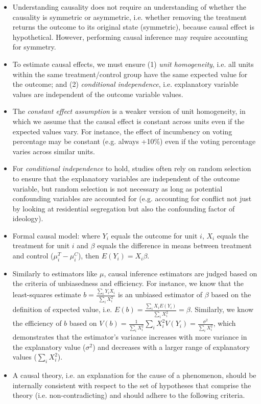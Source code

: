 \documentclass[11pt,letterpaper]{article}
\begin{document}
\begin{itemize}
\item Understanding causality does not require an understanding of whether the causality is symmetric or asymmetric, i.e. whether removing the treatment returns the outcome to its original state (symmetric), because causal effect is hypothetical. However, performing causal inference may require accounting for symmetry.
\item To estimate causal effects, we must ensure (1) \emph{unit homogeneity}, i.e. all units within the same treatment/control group have the same expected value for the outcome; and (2) \emph{conditional independence}, i.e. explanatory variable values are independent of the outcome variable values. 
\item The \emph{constant effect assumption} is a weaker version of unit homogeneity, in which we assume that the causal effect is constant across units even if the expected values vary. For instance, the effect of incumbency on voting percentage may be constant (e.g. always +10\%) even if the voting percentage varies across similar units.
\item For \emph{conditional independence} to hold, studies often rely on random selection to ensure that the explanatory variables are independent of the outcome variable, but random selection is not necessary as long as potential confounding variables are accounted for (e.g. accounting for conflict not just by looking at residential segregation but also the confounding factor of ideology).
\item Formal causal model: where $Y_{i}$ equals the outcome for unit $i$, $X_{i}$ equals the treatment for unit $i$ and $\beta$ equals the difference in means between treatment and control ($\mu^{T}_{i} - \mu^{C}_{i}$), then $E(Y_{i}) = X_{i}\beta$.
\item Similarly to estimators like $\mu$, causal inference estimators are judged based on the criteria of unbiasedness and efficiency. For instance, we know that the least-squares estimate $b=\frac{\sum_{i} Y_{i}X_{i}}{\sum_{i}X_{i}^{2}}$ is an unbiased estimator of $\beta$ based on the definition of expected value, i.e. $E(b) = \frac{\sum_{i}X_{i}E(Y_{i})}{\sum_{i}X_{i}^{2}} = \beta$. Similarly, we know the efficiency of $b$ based on $V(b) = \frac{1}{\sum_{i}X_{i}^{2}}\sum_{i}X_{i}^{2}V(Y_{i}) = \frac{\sigma^{2}}{\sum_{i}X_{i}^{2}}$, which demonstrates that the estimator's variance increases with more variance in the explanatory value ($\sigma^{2}$) and decreases with a larger range of explanatory values ($\sum_{i}X_{i}^{2}$).
\item A causal theory, i.e. an explanation for the cause of a phenomenon, should be internally consistent with respect to the set of hypotheses that comprise the theory (i.e. non-contradicting) and should adhere to the following criteria.

\end{itemize}
\end{document}
